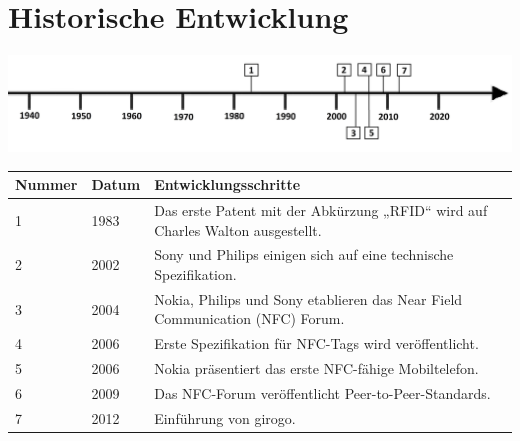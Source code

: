 \section*{Historische Entwicklung~\cite{nfc.1}}
\includegraphics[width=\textwidth]{Kapitel/NFC/Grafiken/Zeitstrahl}
\par
\noindent
\begin{tabular}{|p{1 cm}|p{3 cm}|p{13.55 cm}|}
	\hline
	Nummer & Datum & Entwicklungsschritte\\
	\hline
	1 & 1983 & Das erste Patent mit der Abkürzung „RFID“ wird auf Charles Walton ausgestellt.\\
	\hline
	2 & 2002 & Sony und Philips einigen sich auf eine technische Spezifikation.\\
	\hline
	3 & 2004 & Nokia, Philips und Sony etablieren das Near Field Communication (NFC) Forum.\\
	\hline
	4 & 2006 & Erste Spezifikation für NFC-Tags wird veröffentlicht.\\
	\hline
	5 & 2006 & Nokia präsentiert das erste NFC-fähige Mobiltelefon.\\
	\hline
	6 & 2009 & Das NFC-Forum veröffentlicht Peer-to-Peer-Standards.\\
	\hline
	7 & 2012 & Einführung von girogo.\\
	\hline
\end{tabular}
\par
